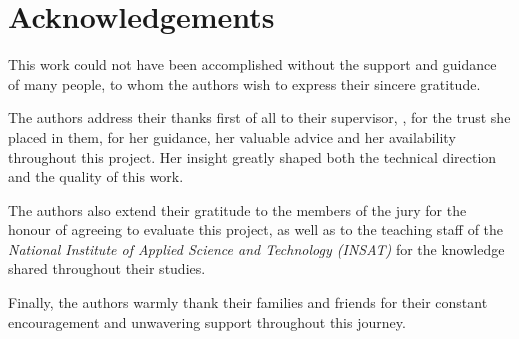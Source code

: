 \chapter*{Acknowledgements}

This work could not have been accomplished without the support and
guidance of many people, to whom the authors wish to express their
sincere gratitude.

The authors address their thanks first of all to their supervisor,
\textbf{\projSupervisor}, for the trust she placed in them, for her
guidance, her valuable advice and her availability throughout this
project. Her insight greatly shaped both the technical direction and
the quality of this work.

The authors also extend their gratitude to the members of the jury for
the honour of agreeing to evaluate this project, as well as to the
teaching staff of the \emph{National Institute of Applied Science and
Technology (INSAT)} for the knowledge shared throughout their studies.

Finally, the authors warmly thank their families and friends for their
constant encouragement and unwavering support throughout this journey.
